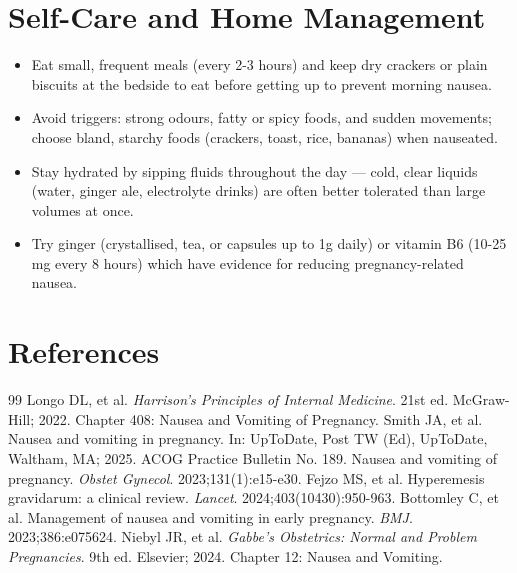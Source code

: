 \section*{Self-Care and Home Management}
\begin{itemize}
  \item Eat small, frequent meals (every 2-3 hours) and keep dry crackers or plain biscuits at the bedside to eat before getting up to prevent morning nausea.
  \item Avoid triggers: strong odours, fatty or spicy foods, and sudden movements; choose bland, starchy foods (crackers, toast, rice, bananas) when nauseated.
  \item Stay hydrated by sipping fluids throughout the day — cold, clear liquids (water, ginger ale, electrolyte drinks) are often better tolerated than large volumes at once.
  \item Try ginger (crystallised, tea, or capsules up to 1g daily) or vitamin B6 (10-25 mg every 8 hours) which have evidence for reducing pregnancy-related nausea.
\end{itemize}

\section*{References}

\begin{thebibliography}{99}
 Longo DL, et al. \emph{Harrison's Principles of Internal Medicine}. 21st ed. McGraw-Hill; 2022. Chapter 408: Nausea and Vomiting of Pregnancy.
 Smith JA, et al. Nausea and vomiting in pregnancy. In: UpToDate, Post TW (Ed), UpToDate, Waltham, MA; 2025.
 ACOG Practice Bulletin No. 189. Nausea and vomiting of pregnancy. \emph{Obstet Gynecol}. 2023;131(1):e15-e30.
 Fejzo MS, et al. Hyperemesis gravidarum: a clinical review. \emph{Lancet}. 2024;403(10430):950-963.
 Bottomley C, et al. Management of nausea and vomiting in early pregnancy. \emph{BMJ}. 2023;386:e075624.
 Niebyl JR, et al. \emph{Gabbe's Obstetrics: Normal and Problem Pregnancies}. 9th ed. Elsevier; 2024. Chapter 12: Nausea and Vomiting.
\end{thebibliography}
